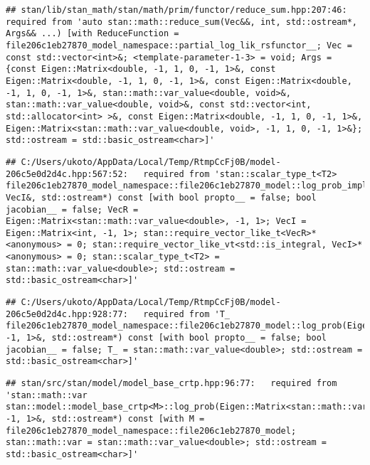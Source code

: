 \documentclass[
]{article}
\begin{document}
\begin{verbatim}
## stan/lib/stan_math/stan/math/prim/functor/reduce_sum.hpp:207:46:   required from 'auto stan::math::reduce_sum(Vec&&, int, std::ostream*, Args&& ...) [with ReduceFunction = file206c1eb27870_model_namespace::partial_log_lik_rsfunctor__; Vec = const std::vector<int>&; <template-parameter-1-3> = void; Args = {const Eigen::Matrix<double, -1, 1, 0, -1, 1>&, const Eigen::Matrix<double, -1, 1, 0, -1, 1>&, const Eigen::Matrix<double, -1, 1, 0, -1, 1>&, stan::math::var_value<double, void>&, stan::math::var_value<double, void>&, const std::vector<int, std::allocator<int> >&, const Eigen::Matrix<double, -1, 1, 0, -1, 1>&, Eigen::Matrix<stan::math::var_value<double, void>, -1, 1, 0, -1, 1>&}; std::ostream = std::basic_ostream<char>]'
\end{verbatim}

\begin{verbatim}
## C:/Users/ukoto/AppData/Local/Temp/RtmpCcFj0B/model-206c5e0d2d4c.hpp:567:52:   required from 'stan::scalar_type_t<T2> file206c1eb27870_model_namespace::file206c1eb27870_model::log_prob_impl(VecR&, VecI&, std::ostream*) const [with bool propto__ = false; bool jacobian__ = false; VecR = Eigen::Matrix<stan::math::var_value<double>, -1, 1>; VecI = Eigen::Matrix<int, -1, 1>; stan::require_vector_like_t<VecR>* <anonymous> = 0; stan::require_vector_like_vt<std::is_integral, VecI>* <anonymous> = 0; stan::scalar_type_t<T2> = stan::math::var_value<double>; std::ostream = std::basic_ostream<char>]'
\end{verbatim}

\begin{verbatim}
## C:/Users/ukoto/AppData/Local/Temp/RtmpCcFj0B/model-206c5e0d2d4c.hpp:928:77:   required from 'T_ file206c1eb27870_model_namespace::file206c1eb27870_model::log_prob(Eigen::Matrix<T_job_param, -1, 1>&, std::ostream*) const [with bool propto__ = false; bool jacobian__ = false; T_ = stan::math::var_value<double>; std::ostream = std::basic_ostream<char>]'
\end{verbatim}

\begin{verbatim}
## stan/src/stan/model/model_base_crtp.hpp:96:77:   required from 'stan::math::var stan::model::model_base_crtp<M>::log_prob(Eigen::Matrix<stan::math::var_value<double>, -1, 1>&, std::ostream*) const [with M = file206c1eb27870_model_namespace::file206c1eb27870_model; stan::math::var = stan::math::var_value<double>; std::ostream = std::basic_ostream<char>]'
\end{verbatim}
\end{document}
